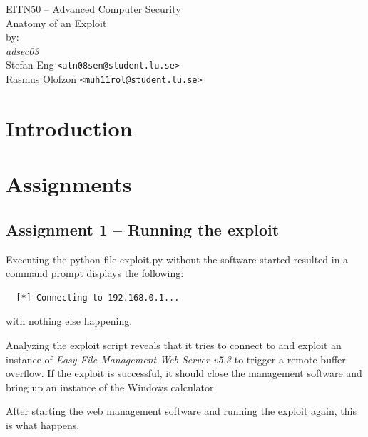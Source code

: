 \documentclass[10pt]{article}
\begin{document}

  \thispagestyle{empty}
  \vspace*{3cm}
  \begin{center}
    \huge{EITN50 -- Advanced Computer Security} \\
    \vspace{0.3cm}
    \LARGE{Anatomy of an Exploit} \\
    \vspace{1cm}
    \large{by: \\ \vspace{0.2cm}
	\textit{adsec03} \\
        Stefan Eng \texttt{<atn08sen@student.lu.se>} \\
        Rasmus Olofzon \texttt{<muh11rol@student.lu.se>}
        } \\
  \end{center}


  \newpage

  \section*{Introduction}

  \section{Assignments}

    \subsection{Assignment 1 -- Running the exploit}

      Executing the python file exploit.py without the software started resulted in a
      command prompt displays the following:
      \begin{verbatim}
  [*] Connecting to 192.168.0.1...
      \end{verbatim}
      with nothing else happening.

      Analyzing the exploit script reveals that it tries to connect to and
      exploit an instance of \textit{Easy File Management Web Server v5.3} to trigger a
      remote buffer overflow. If the exploit is successful, it should close the
      management software and bring up an instance of the Windows calculator.

      After starting the web management software and running the exploit again,
      this is what happens.
\end{document}
